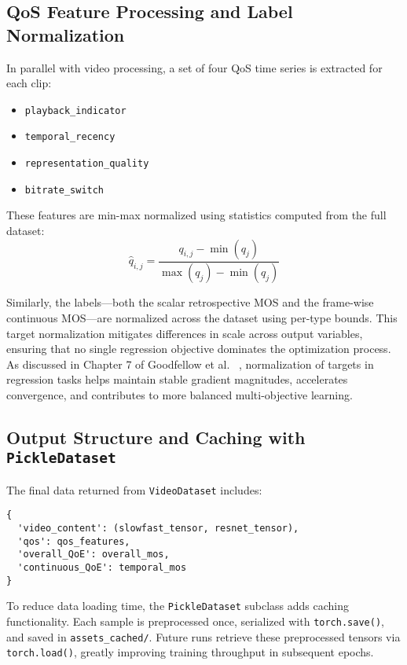 \subsection{QoS Feature Processing and Label Normalization}

In parallel with video processing, a set of four QoS time series is extracted for each clip:
\begin{itemize}
    \item \texttt{playback\_indicator}
    \item \texttt{temporal\_recency}
    \item \texttt{representation\_quality}
    \item \texttt{bitrate\_switch}
\end{itemize}

These features are min-max normalized using statistics computed from the full dataset:
\[
\hat{q}_{i,j} = \frac{q_{i,j} - \min(q_j)}{\max(q_j) - \min(q_j)}
\]

Similarly, the labels—both the scalar retrospective MOS and the frame-wise continuous MOS—are normalized across the dataset using per-type bounds. This target normalization mitigates differences in scale across output variables, ensuring that no single regression objective dominates the optimization process. As discussed in Chapter 7 of Goodfellow et al. ~\cite{goodfellow2016deep}, normalization of targets in regression tasks helps maintain stable gradient magnitudes, accelerates convergence, and contributes to more balanced multi-objective learning.

\subsection{Output Structure and Caching with \texttt{PickleDataset}}

The final data returned from \texttt{VideoDataset} includes:
\begin{verbatim}
{
  'video_content': (slowfast_tensor, resnet_tensor),
  'qos': qos_features,
  'overall_QoE': overall_mos,
  'continuous_QoE': temporal_mos
}
\end{verbatim}

To reduce data loading time, the \texttt{PickleDataset} subclass adds caching functionality. Each sample is preprocessed once, serialized with \texttt{torch.save()}, and saved in \texttt{assets\_cached/}. Future runs retrieve these preprocessed tensors via \texttt{torch.load()}, greatly improving training throughput in subsequent epochs.

